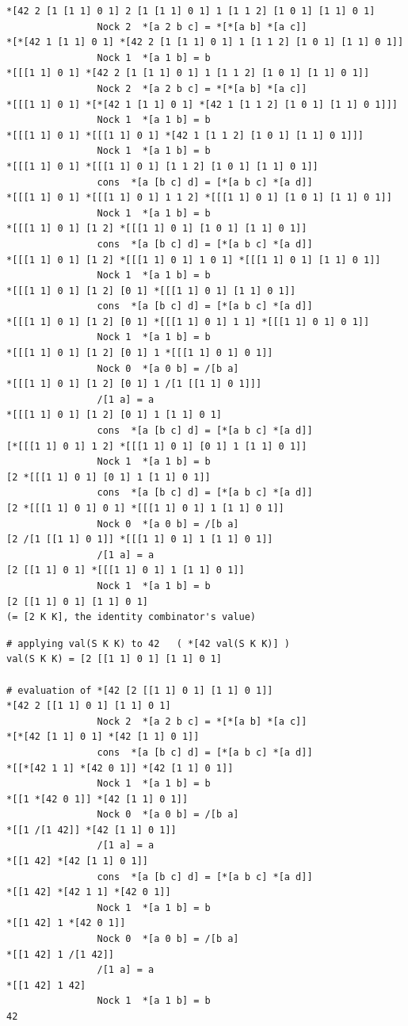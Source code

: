 \documentclass[twoside]{article}
\begin{document}
\begin{lstlisting}[style=listingblock,label=lst:identity-law-2,caption={Evaluation of \texttt{S K K 42}.}]
*[42 2 [1 [1 1] 0 1] 2 [1 [1 1] 0 1] 1 [1 1 2] [1 0 1] [1 1] 0 1]
                Nock 2  *[a 2 b c] = *[*[a b] *[a c]]
*[*[42 1 [1 1] 0 1] *[42 2 [1 [1 1] 0 1] 1 [1 1 2] [1 0 1] [1 1] 0 1]]
                Nock 1  *[a 1 b] = b
*[[[1 1] 0 1] *[42 2 [1 [1 1] 0 1] 1 [1 1 2] [1 0 1] [1 1] 0 1]]
                Nock 2  *[a 2 b c] = *[*[a b] *[a c]]
*[[[1 1] 0 1] *[*[42 1 [1 1] 0 1] *[42 1 [1 1 2] [1 0 1] [1 1] 0 1]]]
                Nock 1  *[a 1 b] = b
*[[[1 1] 0 1] *[[[1 1] 0 1] *[42 1 [1 1 2] [1 0 1] [1 1] 0 1]]]
                Nock 1  *[a 1 b] = b
*[[[1 1] 0 1] *[[[1 1] 0 1] [1 1 2] [1 0 1] [1 1] 0 1]]
                cons  *[a [b c] d] = [*[a b c] *[a d]]
*[[[1 1] 0 1] *[[[1 1] 0 1] 1 1 2] *[[[1 1] 0 1] [1 0 1] [1 1] 0 1]]
                Nock 1  *[a 1 b] = b
*[[[1 1] 0 1] [1 2] *[[[1 1] 0 1] [1 0 1] [1 1] 0 1]]
                cons  *[a [b c] d] = [*[a b c] *[a d]]
*[[[1 1] 0 1] [1 2] *[[[1 1] 0 1] 1 0 1] *[[[1 1] 0 1] [1 1] 0 1]]
                Nock 1  *[a 1 b] = b
*[[[1 1] 0 1] [1 2] [0 1] *[[[1 1] 0 1] [1 1] 0 1]]
                cons  *[a [b c] d] = [*[a b c] *[a d]]
*[[[1 1] 0 1] [1 2] [0 1] *[[[1 1] 0 1] 1 1] *[[[1 1] 0 1] 0 1]]
                Nock 1  *[a 1 b] = b
*[[[1 1] 0 1] [1 2] [0 1] 1 *[[[1 1] 0 1] 0 1]]
                Nock 0  *[a 0 b] = /[b a]
*[[[1 1] 0 1] [1 2] [0 1] 1 /[1 [[1 1] 0 1]]]
                /[1 a] = a
*[[[1 1] 0 1] [1 2] [0 1] 1 [1 1] 0 1]
                cons  *[a [b c] d] = [*[a b c] *[a d]]
[*[[[1 1] 0 1] 1 2] *[[[1 1] 0 1] [0 1] 1 [1 1] 0 1]]
                Nock 1  *[a 1 b] = b
[2 *[[[1 1] 0 1] [0 1] 1 [1 1] 0 1]]
                cons  *[a [b c] d] = [*[a b c] *[a d]]
[2 *[[[1 1] 0 1] 0 1] *[[[1 1] 0 1] 1 [1 1] 0 1]]
                Nock 0  *[a 0 b] = /[b a]
[2 /[1 [[1 1] 0 1]] *[[[1 1] 0 1] 1 [1 1] 0 1]]
                /[1 a] = a
[2 [[1 1] 0 1] *[[[1 1] 0 1] 1 [1 1] 0 1]]
                Nock 1  *[a 1 b] = b
[2 [[1 1] 0 1] [1 1] 0 1]
(= [2 K K], the identity combinator's value)
\end{lstlisting}

\begin{lstlisting}[style=listingblock,label=lst:identity-law-3,caption={Application of \texttt{S K K 42}.}]
# applying val(S K K) to 42   ( *[42 val(S K K)] )
val(S K K) = [2 [[1 1] 0 1] [1 1] 0 1]

# evaluation of *[42 [2 [[1 1] 0 1] [1 1] 0 1]]
*[42 2 [[1 1] 0 1] [1 1] 0 1]
                Nock 2  *[a 2 b c] = *[*[a b] *[a c]]
*[*[42 [1 1] 0 1] *[42 [1 1] 0 1]]
                cons  *[a [b c] d] = [*[a b c] *[a d]]
*[[*[42 1 1] *[42 0 1]] *[42 [1 1] 0 1]]
                Nock 1  *[a 1 b] = b
*[[1 *[42 0 1]] *[42 [1 1] 0 1]]
                Nock 0  *[a 0 b] = /[b a]
*[[1 /[1 42]] *[42 [1 1] 0 1]]
                /[1 a] = a
*[[1 42] *[42 [1 1] 0 1]]
                cons  *[a [b c] d] = [*[a b c] *[a d]]
*[[1 42] *[42 1 1] *[42 0 1]]
                Nock 1  *[a 1 b] = b
*[[1 42] 1 *[42 0 1]]
                Nock 0  *[a 0 b] = /[b a]
*[[1 42] 1 /[1 42]]
                /[1 a] = a
*[[1 42] 1 42]
                Nock 1  *[a 1 b] = b
42
\end{lstlisting}
\end{document}
